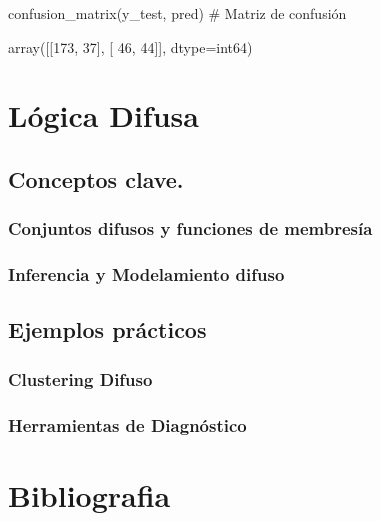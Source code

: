 \documentclass[
  a4paper,
  DIV=11,
  numbers=noendperiod]{scrreprt}
\begin{document}
confusion\_matrix(y\_test, pred) \# Matriz de confusión

array({[}{[}173, 37{]}, {[} 46, 44{]}{]}, dtype=int64)


\hypertarget{luxf3gica-difusa}{%
\chapter{Lógica Difusa}\label{luxf3gica-difusa}}

\hypertarget{conceptos-clave.}{%
\section{Conceptos clave.}\label{conceptos-clave.}}

\hypertarget{conjuntos-difusos-y-funciones-de-membresuxeda}{%
\subsection{Conjuntos difusos y funciones de
membresía}\label{conjuntos-difusos-y-funciones-de-membresuxeda}}

\hypertarget{inferencia-y-modelamiento-difuso}{%
\subsection{Inferencia y Modelamiento
difuso}\label{inferencia-y-modelamiento-difuso}}

\hypertarget{ejemplos-pruxe1cticos-1}{%
\section{Ejemplos prácticos}\label{ejemplos-pruxe1cticos-1}}

\hypertarget{clustering-difuso}{%
\subsection{Clustering Difuso}\label{clustering-difuso}}

\hypertarget{herramientas-de-diagnuxf3stico}{%
\subsection{Herramientas de
Diagnóstico}\label{herramientas-de-diagnuxf3stico}}


\hypertarget{bibliografia}{%
\chapter*{Bibliografia}\label{bibliografia}}
\end{document}

